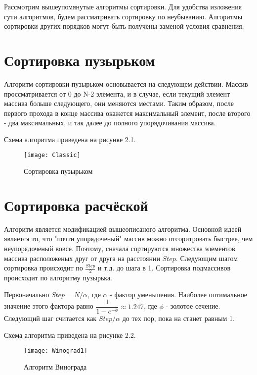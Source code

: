 Рассмотрим вышеупомянутые алгоритмы сортировки. Для удобства изложения сути алгоритмов, будем рассматривать сортировку по неубыванию. Алгоритмы сортировки других порядков могут быть получены заменой условия сравнения.

\section{Сортировка пузырьком}
Алгоритм сортировки пузырьком основывается на следующем действии. Массив проссматривается от 0 до N-2 элемента, и в случае, если текущий элемент массива больше следующего, они меняются местами. Таким образом, после первого прохода в конце массива окажется максимальный элемент, после второго - два максимальных, и так далее до полного упорядочивания массива.

Схема алгоритма приведена на рисунке 2.1.
\begin{figure}[h]
	\begin{center}
		{\texttt{[image: Classic]}}
		\caption{Сортировка пузырьком}
	\end{center}
\end{figure}


\section{Сортировка расчёской}
Алгоритм является модификацией вышеописаного алгоритма. Основной идеей является то, что "почти упорядоченый" массив можно отсоритровать быстрее, чем неупорядоченый вовсе. Поэтому, сначала сортируются множества элементов массива расположеных друг от друга на расстоянии $ Step $. Следующим шагом сортировка происходит по $ \frac{Step}{2} $ и т.д. до шага в 1. Сортировка подмассивов происходит по алгоритму пузырька.

Первоначально $Step = N/\alpha$, где $\alpha$ - фактор уменьшения. Наиболее оптимальное значение этого фактора равно $\dfrac{1}{1-e^{-\phi}} \approx 1.247$, где $\phi$ - золотое сечение. Следующий шаг считается как $Step/\alpha$ до тех пор, пока на станет равным 1.

Схема алгоритма приведена на рисунке 2.2.
\begin{figure}[h]
	\begin{center}
		{\texttt{[image: Winograd1]}}
		\caption{Алгоритм Винограда}
	\end{center}
\end{figure}


